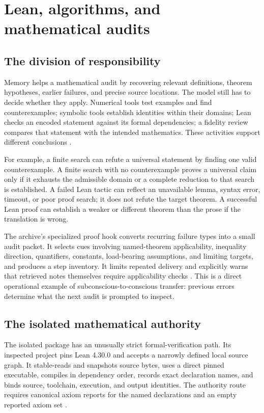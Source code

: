 \section{Lean, algorithms, and mathematical audits}
\label{sec:verification}

\subsection{The division of responsibility}

Memory helps a mathematical audit by recovering relevant definitions, theorem hypotheses, earlier failures, and precise source locations. The model still has to decide whether they apply. Numerical tools test examples and find counterexamples; symbolic tools establish identities within their domains; Lean checks an encoded statement against its formal dependencies; a fidelity review compares that statement with the intended mathematics. These activities support different conclusions \citep{leanref,leanarchitecture}.

For example, a finite search can refute a universal statement by finding one valid counterexample. A finite search with no counterexample proves a universal claim only if it exhausts the admissible domain or a complete reduction to that search is established. A failed Lean tactic can reflect an unavailable lemma, syntax error, timeout, or poor proof search; it does not refute the target theorem. A successful Lean proof can establish a weaker or different theorem than the prose if the translation is wrong.

The archive's specialized proof hook converts recurring failure types into a small audit packet. It selects cues involving named-theorem applicability, inequality direction, quantifiers, constants, load-bearing assumptions, and limiting targets, and produces a step inventory. It limits repeated delivery and explicitly warns that retrieved notes themselves require applicability checks \citep{proofhooks}. This is a direct operational example of subconscious-to-conscious transfer: previous errors determine what the next audit is prompted to inspect.

\subsection{The isolated mathematical authority}

The isolated package has an unusually strict formal-verification path. Its inspected project pins Lean 4.30.0 and accepts a narrowly defined local source graph. It stable-reads and snapshots source bytes, uses a direct pinned executable, compiles in dependency order, records exact declaration names, and binds source, toolchain, execution, and output identities. The authority route requires canonical axiom reports for the named declarations and an empty reported axiom set \citep{leanarchitecture,leanimplementation}.

